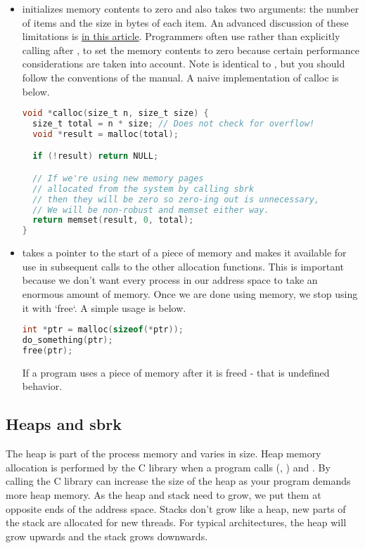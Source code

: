 \begin{itemize}
\begin{lstlisting}[language=C]
}
\end{lstlisting}

\item {} initializes memory contents to zero and also takes two arguments: the number of items and the size in bytes of each item.
An advanced discussion of these limitations is \href{http://locklessinc.com/articles/calloc/}{in this article}.
Programmers often use  rather than explicitly calling  after , to set the memory contents to zero because certain performance considerations are taken into account.
Note  is identical to , but you should follow the conventions of the manual.
A naive implementation of calloc is below.

\begin{lstlisting}[language=C]
void *calloc(size_t n, size_t size) {
  size_t total = n * size; // Does not check for overflow!
  void *result = malloc(total);

  if (!result) return NULL;

  // If we're using new memory pages
  // allocated from the system by calling sbrk
  // then they will be zero so zero-ing out is unnecessary,
  // We will be non-robust and memset either way.
  return memset(result, 0, total);
}
\end{lstlisting}

\item {} takes a pointer to the start of a piece of memory and makes it available for use in subsequent calls to the other allocation functions.
This is important because we don't want every process in our address space to take an enormous amount of memory.
Once we are done using memory, we stop using it with `free`.
A simple usage is below.

\begin{lstlisting}[language=C]
int *ptr = malloc(sizeof(*ptr));
do_something(ptr);
free(ptr);
\end{lstlisting}

If a program uses a piece of memory after it is freed - that is undefined behavior.

\end{itemize}

\subsection{Heaps and sbrk}

The heap is part of the process memory and varies in size.
Heap memory allocation is performed by the C library when a program calls  (, ) and .
By calling  the C library can increase the size of the heap as your program demands more heap memory.
As the heap and stack need to grow, we put them at opposite ends of the address space.
Stacks don't grow like a heap, new parts of the stack are allocated for new threads.
For typical architectures, the heap will grow upwards and the stack grows downwards.

